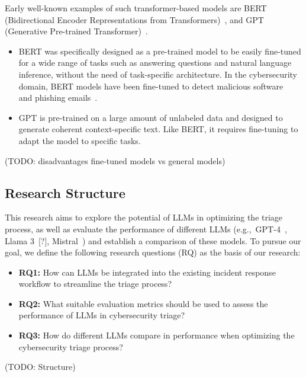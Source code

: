 Early well-known examples of such transformer-based models are BERT
(Bidirectional Encoder Representations from Transformers)\ \citep{devlin2018bert}, and
GPT (Generative Pre-trained Transformer)\ \citep{radford2018improving}.
\begin{itemize}
    \item BERT was specifically designed as a pre-trained model to be easily fine-tuned for a wide range of tasks such
    as answering questions and natural language inference, without the need of task-specific architecture.
    In the cybersecurity domain, BERT models have been fine-tuned to detect malicious software\ \citep{rahali2021malbert}
    and phishing emails\ \citep{lee2020catbert}.
    \item GPT is pre-trained on a large amount of unlabeled data and designed to generate coherent context-specific
    text.
    Like BERT, it requires fine-tuning to adapt the model to specific tasks.
\end{itemize}

(TODO: disadvantages fine-tuned models vs general models) %

\subsection{Research Structure}
\label{subsec:intro-research-structure}


This research aims to explore the potential of LLMs in optimizing the triage process, as well as evaluate the
performance of different LLMs (e.g.,\ GPT-4\ \citep{achiam2023gpt}, Llama 3\ [?],
Mistral\ \citep{jiang2023mistral}) and establish a comparison of these models.
To pursue our goal, we define the following research questions (RQ) as the basis of our research:

\begin{itemize}
    \item \textbf{RQ1:} How can LLMs be integrated into the existing incident response workflow to streamline the triage process?
    \item \textbf{RQ2:} What suitable evaluation metrics should be used to assess the performance of LLMs in cybersecurity triage?
    \item \textbf{RQ3:} How do different LLMs compare in performance when optimizing the cybersecurity triage process?
\end{itemize}

(TODO: Structure) %
